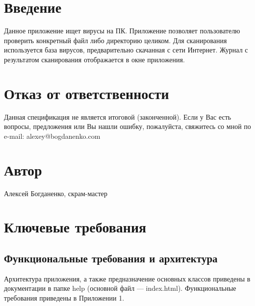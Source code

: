 \section{Введение}
Данное приложение ищет вирусы на ПК. Приложение позволяет пользователю проверить конкретный файл либо директорию целиком. Для сканирования используется база вирусов, предварительно скачанная с сети Интернет. Журнал с результатом сканирования отображается в окне приложения.
\section{Отказ от ответственности}
Данная спецификация не является итоговой (законченной). Если у Вас есть вопросы, предложения или Вы нашли ошибку, пожалуйста, свяжитесь со мной по e-mail: alexey@bogdanenko.com
\section{Автор}
Алексей Богданенко, скрам-мастер
\section{Ключевые требования}
\subsection{Функциональные требования и архитектура}
Архитектура приложения, а также предназначение основных классов приведены в документации в папке help (основной файл — index.html). Функциональные требования приведены в Приложении 1.
